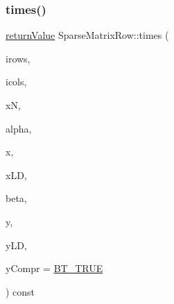 \mbox{\label{class_sparse_matrix_row_ad175fdf0c1bc012a8ab0d760e914f4ac}} 
\subsubsection{\texorpdfstring{times()}{times()}\hspace{0.1cm}{\footnotesize\ttfamily [2/2]}}
{\footnotesize\ttfamily \hyperlink{_message_handling_8hpp_a81d556f613bfbabd0b1f9488c0fa865e}{return\+Value} Sparse\+Matrix\+Row\+::times (\begin{DoxyParamCaption}\item[{const \hyperlink{class_indexlist}{Indexlist} $\ast$const}]{irows,  }\item[{const \hyperlink{class_indexlist}{Indexlist} $\ast$const}]{icols,  }\item[{\hyperlink{_types_8hpp_ab6fd6105e64ed14a0c9281326f05e623}{int\+\_\+t}}]{xN,  }\item[{\hyperlink{qp_o_a_s_e_s__wrapper_8h_a0d00e2b3dfadee81331bbb39068570c4}{real\+\_\+t}}]{alpha,  }\item[{const \hyperlink{qp_o_a_s_e_s__wrapper_8h_a0d00e2b3dfadee81331bbb39068570c4}{real\+\_\+t} $\ast$}]{x,  }\item[{\hyperlink{_types_8hpp_ab6fd6105e64ed14a0c9281326f05e623}{int\+\_\+t}}]{x\+LD,  }\item[{\hyperlink{qp_o_a_s_e_s__wrapper_8h_a0d00e2b3dfadee81331bbb39068570c4}{real\+\_\+t}}]{beta,  }\item[{\hyperlink{qp_o_a_s_e_s__wrapper_8h_a0d00e2b3dfadee81331bbb39068570c4}{real\+\_\+t} $\ast$}]{y,  }\item[{\hyperlink{_types_8hpp_ab6fd6105e64ed14a0c9281326f05e623}{int\+\_\+t}}]{y\+LD,  }\item[{\hyperlink{_types_8hpp_a20f82124c82b6f5686a7fce454ef9089}{Boolean\+Type}}]{y\+Compr = {\ttfamily \hyperlink{_types_8hpp_a20f82124c82b6f5686a7fce454ef9089a34c57965bfb07125b09326a69019f9c6}{B\+T\+\_\+\+T\+R\+UE}} }\end{DoxyParamCaption}) const\hspace{0.3cm}{\ttfamily [virtual]}}

